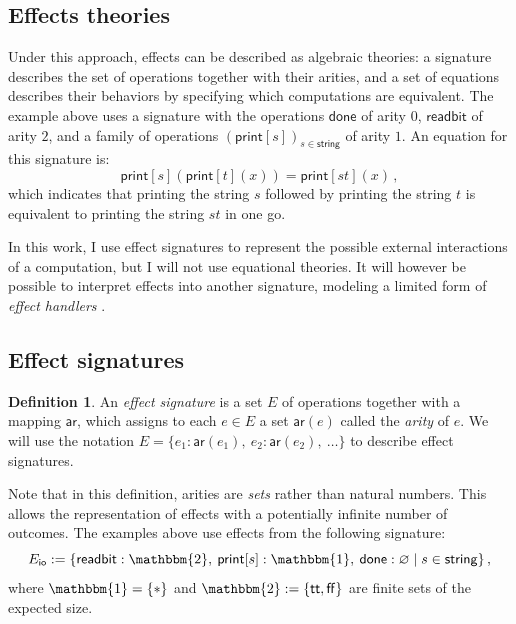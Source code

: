 \documentclass[11pt,oneside,draft]{book}
\theoremstyle{definition}
\newtheorem{definition}[theorem]{Definition}
\newcommand{\kw}[1]{\ensuremath{ \mathsf{#1} }}
\begin{document}

\subsection{Effects theories} %

Under this approach,
effects can be described as algebraic theories:
a signature describes the set of operations together with their arities,
and a set of equations describes their behaviors
by specifying which computations are equivalent.
The example above uses a signature with the operations
$\kw{done}$ of arity $0$,
$\kw{readbit}$ of arity $2$,
and a family of operations $(\kw{print}[s])_{s \in \kw{string}}$
of arity $1$.
An equation for this signature is:
\[
    \kw{print}[s](\kw{print}[t](x)) =
    \kw{print}[st](x) \,,
\]
which indicates that
printing the string $s$ followed by
printing the string $t$ is equivalent to
printing the string $st$ in one go.

In this work,
I use effect signatures to represent
the possible external interactions
of a computation,
but I will not use equational theories.
It will however be possible to interpret effects
into another signature,
modeling a limited form of
\emph{effect handlers} \citep{eff}.


\subsection{Effect signatures} %

\begin{definition} \label{def:esig}
An \emph{effect signature}
is a set $E$ of operations
together with a mapping $\kw{ar}$,
which assigns to each $e \in E$ a set $\kw{ar}(e)$
called the \emph{arity} of $e$.
We will use the notation
$E = \{ e_1 : \kw{ar}(e_1), \: e_2 : \kw{ar}(e_2), \: \ldots \}$
to describe effect signatures.
\end{definition}

Note that in this definition,
arities are \emph{sets} rather than natural numbers.
This allows the representation of effects
with a potentially infinite number of outcomes.
The examples above
use effects from the following signature:
\[
  E_\kw{io} :=
  \{ \kw{readbit} : \mathbbm{2}, \:
     \kw{print}[s] : \mathbbm{1}, \:
     \kw{done} : \varnothing \mid
     s \in \kw{string} \}
  \,,
\]
where $\mathbbm{1} = \{ * \}$ and $\mathbbm{2} := \{ \kw{tt}, \kw{ff} \}$
are finite sets of the expected size.
\end{document}
